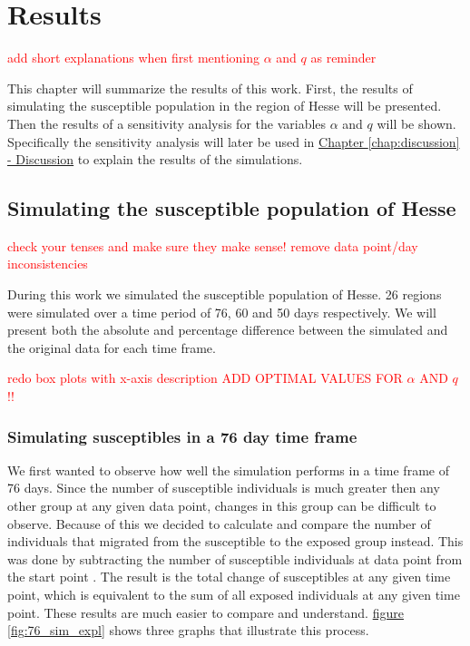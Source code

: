 
\chapter{Results} %
\textcolor{red}{add short explanations when first mentioning $\alpha$ and $q$ as reminder}

\label{chap:results} %
This chapter will summarize the results of this work. First, the results of simulating the susceptible population
in the region of Hesse will be presented. Then the results of a sensitivity analysis for the variables $\alpha$ and
$q$ will be shown. Specifically the sensitivity analysis will later be used in \hyperref[chap:discussion]{Chapter
\ref*{chap:discussion} - Discussion} to explain the results of the simulations.



\section{Simulating the susceptible population of Hesse}
\label{sec:sim_res}
\textcolor{red}{check your tenses and make sure they make sense!}
\textcolor{red}{remove data point/day inconsistencies}

During this work we simulated the susceptible population of Hesse. 26 regions were simulated over a time period of
76, 60 and 50 days respectively. We will present both the absolute and percentage difference between the simulated
and the original data for each time frame.

\textcolor{red}{redo box plots with x-axis description}
\textcolor{red}{ADD OPTIMAL VALUES FOR $\alpha$ AND $q$!!}
\subsection{Simulating susceptibles in a 76 day time frame}
We first wanted to observe how well the simulation performs in a time frame of 76 days. Since the number of susceptible
individuals is much greater then any other group at any given data point, changes in this group can be difficult to
observe. Because of this we decided to calculate and compare the number of individuals that migrated from the susceptible
to the exposed group instead. This was done by subtracting the number of susceptible individuals at data point  from
the start point . The result is the total change of susceptibles at any given time point, which is equivalent to the 
sum of all exposed individuals at any given time point. These results are much easier to compare and understand.
\hyperref[fig:76_sim_expl]{figure \ref*{fig:76_sim_expl}} shows three graphs that illustrate this process.


